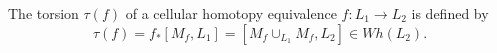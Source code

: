 The torsion $\tau(f)$ of a cellular homotopy equivalence $f: L_1 \rightarrow L_2$ is defined by
$$\tau(f) = f_*[M_f, L_1] = [M_f \cup_{L_1} M_f, L_2] \in Wh(L_2).$$
